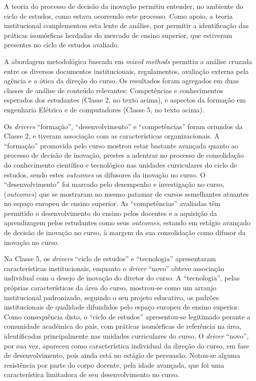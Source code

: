 \documentclass{textolivre}
\begin{document}
A teoria do processo de decisão da inovação permitiu entender, no ambiente do ciclo de estudos, como estava ocorrendo este processo. Como apoio, a teoria institucional complementou esta lente de análise, por permitir a identificação das práticas isomórficas herdadas do mercado de ensino superior, que estiveram presentes no ciclo de estudos avaliado.

A abordagem metodológica baseada em \textit{mixed methods} permitiu a análise cruzada entre os diversos documentos institucionais, regulamentos, avaliação externa pela agência e a ótica da direção do curso. Os resultados foram agregados em duas classes de análise de conteúdo relevantes: Competências e conhecimentos esperados dos estudantes (Classe 2, no texto acima), e aspectos da formação em engenharia Elétrica e de computadores (Classe 5, no texto acima).   

Os \textit{drivers} “formação”, “desenvolvimento” e “competências” foram oriundos da Classe 2, e tiveram associação com as características organizacionais. A “formação” promovida pelo curso mostrou estar bastante avançada quanto ao processo de decisão de inovação, prestes a adentrar no processo de consolidação do conhecimento científico e tecnológico nas unidades curriculares do ciclo de estudos, sendo estes \textit{outcomes} os difusores da inovação no curso. O “desenvolvimento” foi marcado pelo desempenho e investigação no curso, (\textit{outcomes}) que se mostraram no mesmo patamar de cursos semelhantes atuantes no espaço europeu de ensino superior. As “competências” avaliadas têm permitido o desenvolvimento do ensino pelos docentes e a aquisição da aprendizagem pelos estudantes como seus \textit{outcomes}, estando em estágio avançado de decisão de inovação no curso, à margem da sua consolidação como difusor da inovação no curso.

Na Classe 5, os \textit{drivers} “ciclo de estudos” e “tecnologia” apresentaram características institucionais, enquanto o \textit{driver} “novo” obteve associação individual com o desejo de inovação do diretor do curso. A “tecnologia”, pelas próprias características da área do curso, mostrou-se como um arranjo institucional padronizado, seguindo o seu projeto educativo, os padrões institucionais de qualidade difundidos pelo espaço europeu de ensino superior. Como consequência disto, o “ciclo de estudos” apresentou-se legitimado perante a comunidade académica do país, com práticas isomórficas de referência na área, identificadas principalmente nas unidades curriculares do curso. O \textit{driver} “novo”, por sua vez, apareceu como característica individual da direção do curso, em fase de desenvolvimento, pois ainda está no estágio de persuasão. Notou-se alguma resistência por parte do corpo docente, pela idade avançada, que foi uma característica limitadora de seu desenvolvimento no curso. 
\end{document}
